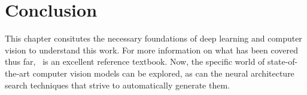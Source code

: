 \section{Conclusion}
This chapter consitutes the necessary foundations of deep learning and computer vision to understand this work. For
more information on what has been covered thus far,~\cite{goodfellow2016}
is an excellent reference textbook. Now, the specific world of state-of-the-art computer vision models can be explored,
as can the neural architecture search techniques that
strive to automatically generate them.